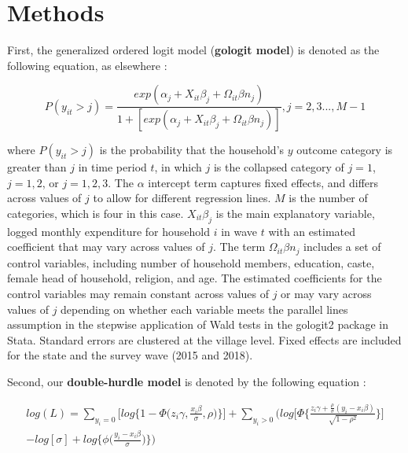 \documentclass[11pt]{article}
\begin{document}
\clearpage

\section{Methods}
\label{sect:methods}
First, the generalized ordered logit model (\textbf{gologit model}) is denoted as the following equation, as elsewhere \citep{Williams2016}:

\begin{equation}
P(y_{it}>j)=\frac{exp(\alpha_{j} + X_{it} \beta_j + \Omega_{it}\beta n_{j})}{1+[exp(\alpha_{j} + X_{it} \beta_j + \Omega_{it} \beta n_{j})]}, j=2,3...,M-1
\end{equation}

where $P(y_{it}>j)$ is the probability that the household's $y$ outcome category is greater than $j$ in time period $t$, in which $j$ is the collapsed category of $j=1$, $j=1,2$, or $j=1,2,3$. The $\alpha$ intercept term captures fixed effects, and differs across values of $j$ to allow for different regression lines. $M$ is the number of categories, which is four in this case. $X_{it} \beta_j$ is the main explanatory variable, logged monthly expenditure for household $i$ in wave $t$ with an estimated coefficient that may vary across values of $j$. The term $\Omega_{it}\beta n_j$ includes a set of control variables, including number of household members, education, caste, female head of household, religion, and age. The estimated coefficients for the control variables may remain constant across values of $j$ or may vary across values of $j$ depending on whether each variable meets the parallel lines assumption in the stepwise application of Wald tests in the gologit2 package in Stata. Standard errors are clustered at the village level. Fixed effects are included for the state and the survey wave (2015 and 2018).

Second, our \textbf{double-hurdle model} is denoted by the following equation \citep{Garcia2013}:

\begin{equation}
\begin{split}
log(L) = \sum_{y_i = 0}^{} \Big[ log \Big\{ 1-\Phi \Big( z_i \gamma, \frac{x_i \beta}{\sigma}, \rho \Big) \Big\} \Big] + \sum_{y_i > 0}^{} \Big( log \Big[ \Phi \Big\{ \frac{z_i \gamma + \frac{\rho}{\sigma}(y_i-x_i\beta) }{\sqrt{1-\rho^2}} \Big\} \Big] 
\\
- log [\sigma] +log \Big\{ \phi \Big( \frac{y_i - x_i \beta}{\sigma} \Big) \Big\} \Big)
\end{split}
\end{equation}
\end{document}

